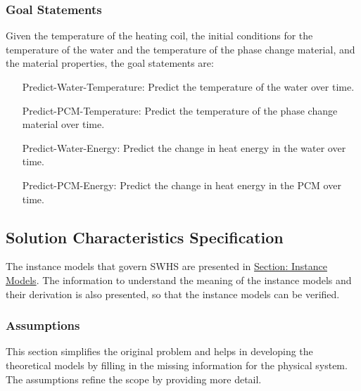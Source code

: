 \documentclass[12pt]{article}
\begin{document}
\subsubsection{Goal Statements}
\label{Sec:GoalStmt}
Given the temperature of the heating coil, the initial conditions for the temperature of the water and the temperature of the phase change material, and the material properties, the goal statements are:

\begin{itemize}
\item[Predict-Water-Temperature:\phantomsection\label{waterTempGS}]{Predict the temperature of the water over time.}
\item[Predict-PCM-Temperature:\phantomsection\label{pcmTempGS}]{Predict the temperature of the phase change material over time.}
\item[Predict-Water-Energy:\phantomsection\label{waterEnergyGS}]{Predict the change in heat energy in the water over time.}
\item[Predict-PCM-Energy:\phantomsection\label{pcmEnergyGS}]{Predict the change in heat energy in the PCM over time.}
\end{itemize}
\subsection{Solution Characteristics Specification}
\label{Sec:SolCharSpec}
The instance models that govern SWHS are presented in \hyperref[Sec:IMs]{Section: Instance Models}. The information to understand the meaning of the instance models and their derivation is also presented, so that the instance models can be verified.

\subsubsection{Assumptions}
\label{Sec:Assumps}
This section simplifies the original problem and helps in developing the theoretical models by filling in the missing information for the physical system. The assumptions refine the scope by providing more detail.
\end{document}
